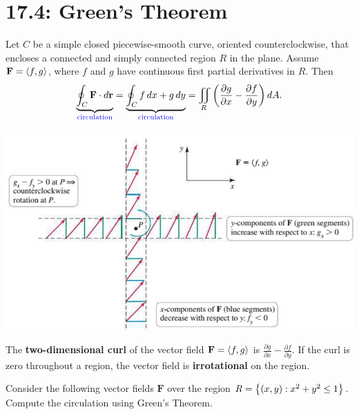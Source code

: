 \documentclass[../mathNotesPreamble]{subfiles}
\begin{document}
\section{17.4: Green's Theorem}

  \begin{thmBox*}
    Let $C$ be a simple closed piecewise-smooth curve, oriented counterclockwise, that encloses a connected and simply connected region $R$ in the plane. Assume $\mathbf F={\left\langle f,g \right\rangle}$, where $f$ and $g$ have continuous first partial derivatives in $R$. Then
      \[\underbrace{\oint_C \mathbf F\cdot d{\mathbf{r}}}_{\textcolor{blue}{\textnormal{circulation}}}=\underbrace{\oint_C f\,dx+g\,dy}_{\textcolor{blue}{\textnormal{circulation}}}=\iint\limits_R{\left(\frac{\partial g}{\partial x}-\frac{\partial f}{\partial y}\right)}\,dA.\]
  \end{thmBox*}

  \begin{flushright}
    \includegraphics[width=0.825\linewidth]{../images/briggs_17_04/fig17_32}
  \end{flushright}

  \begin{defn*}
    The \textbf{two-dimensional curl} of the vector field $\mathbf F={\left\langle f,g \right\rangle}$ is $\displaystyle \frac{\partial g}{\partial x}-\frac{\partial f}{\partial y}$. If the curl is zero throughout a region, the vector field is \textbf{irrotational} on the region.
  \end{defn*}
  \pagebreak

  \noindent
  \begin{ex*}
    Consider the following vector fields $\mathbf F$ over the region $R={\left\{(x,y): x^2+y^2\leq 1\right\}}$. Compute the circulation using Green's Theorem.
  \end{ex*}
  
\end{document}
